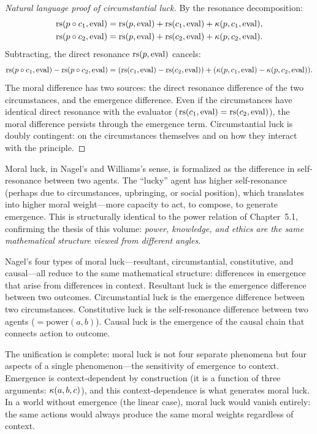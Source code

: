 \begin{proof}[Natural language proof of circumstantial luck]
By the resonance decomposition:
\begin{align*}
  \mathrm{rs}(p \circ c_1, \mathrm{eval}) &= \mathrm{rs}(p, \mathrm{eval}) + \mathrm{rs}(c_1, \mathrm{eval})
  + \kappa(p, c_1, \mathrm{eval}), \\
  \mathrm{rs}(p \circ c_2, \mathrm{eval}) &= \mathrm{rs}(p, \mathrm{eval}) + \mathrm{rs}(c_2, \mathrm{eval})
  + \kappa(p, c_2, \mathrm{eval}).
\end{align*}
Subtracting, the direct resonance $\mathrm{rs}(p, \mathrm{eval})$ cancels:
\[
  \mathrm{rs}(p \circ c_1, \mathrm{eval}) - \mathrm{rs}(p \circ c_2, \mathrm{eval})
  = (\mathrm{rs}(c_1, \mathrm{eval}) - \mathrm{rs}(c_2, \mathrm{eval}))
  + (\kappa(p, c_1, \mathrm{eval}) - \kappa(p, c_2, \mathrm{eval})).
\]
The moral difference has two sources: the direct resonance difference of
the two circumstances, and the emergence difference. Even if the circumstances
have identical direct resonance with the evaluator ($\mathrm{rs}(c_1, \mathrm{eval})
= \mathrm{rs}(c_2, \mathrm{eval})$), the moral difference persists through the emergence
term. Circumstantial luck is doubly contingent: on the circumstances themselves
and on how they interact with the principle.
\end{proof}

\begin{interpretation}
Moral luck, in Nagel's and Williams's sense, is formalized as the difference
in self-resonance between two agents. The ``lucky'' agent has higher
self-resonance (perhaps due to circumstances, upbringing, or social position),
which translates into higher moral weight---more capacity to act, to compose,
to generate emergence. This is structurally identical to the power relation
of Chapter~5.1, confirming the thesis of this volume: \emph{power, knowledge,
and ethics are the same mathematical structure viewed from different angles}.
\end{interpretation}

\begin{interpretation}
Nagel's four types of moral luck---resultant, circumstantial, constitutive,
and causal---all reduce to the same mathematical structure: differences in
emergence that arise from differences in context. Resultant luck is the
emergence difference between two outcomes. Circumstantial luck is the
emergence difference between two circumstances. Constitutive luck is the
self-resonance difference between two agents ($= \mathrm{power}(a,b)$).
Causal luck is the emergence of the causal chain that connects action to
outcome.

The unification is complete: moral luck is not four separate phenomena but
four aspects of a single phenomenon---the sensitivity of emergence to
context. Emergence is context-dependent by construction (it is a function
of three arguments: $\kappa(a,b,c)$), and this context-dependence is
what generates moral luck. In a world without emergence (the linear case),
moral luck would vanish entirely: the same actions would always produce
the same moral weights regardless of context.
\end{interpretation}


